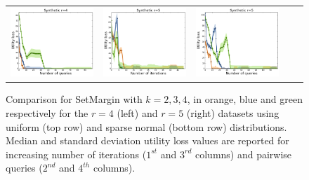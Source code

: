 \documentclass{article}
\renewcommand\[{\begin{equation}}
\renewcommand\]{\end{equation}}
\begin{document}
\begin{figure}[t]
{\begin{tabular}{ccccc}
        \includegraphics[align=c,width=10em]{figures/synthetic_vs_self_4_normal_sparse_per_query_loss} &
        \includegraphics[align=c,width=10em]{figures/synthetic_vs_self_5_normal_sparse_per_iter_loss} &
        \includegraphics[align=c,width=10em]{figures/synthetic_vs_self_5_normal_sparse_per_query_loss}
        \\
     \end{tabular}
    }
    \caption{\label{fig:selfcomparison} Comparison for {\sc SetMargin}
      with $k=2,3,4$, in orange, blue and green respectively for the
      $r=4$ (left) and $r=5$ (right) datasets using uniform (top row) and sparse normal (bottom row) distributions. Median and standard deviation utility loss values are reported for increasing number of iterations ($1^{st}$ and $3^{rd}$ columns) and pairwise queries ($2^{nd}$ and $4^{th}$ columns).}
\end{figure}
\end{document}
